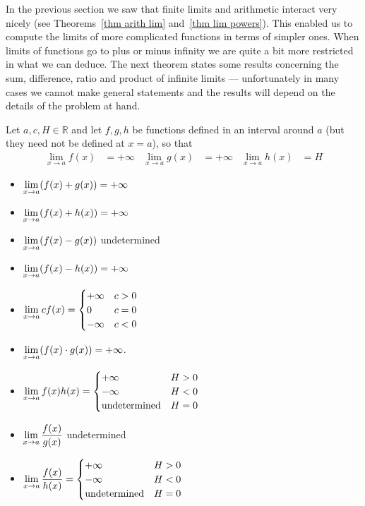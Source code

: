 In the previous section we saw that finite limits and arithmetic interact very nicely
(see Theorems~\ref{thm arith lim} and~\ref{thm lim powers}). This enabled us to compute
the limits of more complicated functions in terms of simpler ones. When limits of
functions go to plus or minus infinity we are quite a bit more restricted in what we can
deduce. The next theorem states some results concerning the sum, difference, ratio and
product of infinite limits --- unfortunately in many cases we cannot make general
statements and the results will depend on the details of the problem at hand.

\begin{theorem}
\label{thm arith inf lim}
 Let $a,c,H \in \mathbb{R}$ and let $f,g,h$ be functions defined in
an interval around $a$ (but they need not be defined at $x=a$), so that
\begin{align*}
  \lim_{x \to a} f(x) &= +\infty &
  \lim_{x \to a} g(x) &= +\infty &
  \lim_{x \to a} h(x) &= H
\end{align*}
\begin{itemize}
 \item $\displaystyle \lim_{x \to a} ( f(x) + g(x) ) = +\infty$
 \item $\displaystyle \lim_{x \to a} ( f(x) + h(x) ) = +\infty$
 \item $\displaystyle \lim_{x \to a} ( f(x) - g(x) )$ undetermined
 \item $\displaystyle \lim_{x \to a} ( f(x) - h(x) ) = +\infty$
 \item $\displaystyle \lim_{x \to a} c f(x) =
\begin{cases}
 +\infty & c>0 \\
0 & c=0 \\
-\infty & c<0
\end{cases}
$
\item $\displaystyle \lim_{x \to a} ( f(x) \cdot g(x) ) = +\infty$.
\item $\displaystyle \lim_{x \to a} f(x) h(x) =
\begin{cases}
 +\infty & H>0 \\
-\infty & H<0\\
\text{undetermined} & H=0
\end{cases}
$
\item $\displaystyle \lim_{x \to a} \frac{f(x)}{g(x)}$ undetermined
\item $\displaystyle \lim_{x \to a} \frac{f(x)}{h(x)} =
\begin{cases}
+\infty & H>0 \\
-\infty & H<0\\
\text{undetermined} & H=0
\end{cases}$


\end{itemize}
\end{theorem}
